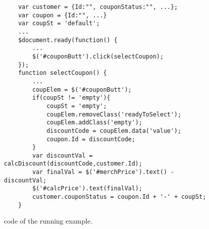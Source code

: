 \begin{figure}
\begin{lstlisting}
	var customer = {Id:"", couponStatus:"", ...};
	var coupon = {Id:"", ...}
	var coupSt = 'default';
	...
	$document.ready(function() {
		...
		$('#couponButt').click(selectCoupon);
	});
	function selectCoupon() {
		...
		coupElem = $('#couponButt');
		if(coupSt != 'empty'){
			coupSt = 'empty';
			coupElem.removeClass('readyToSelect');
			coupElem.addClass('empty');  
			discountCode = coupElem.data('value');
			coupon.Id = discountCode;
		}
		var discountVal = calcDiscount(discountCode,customer.Id);
		var finalVal = $('#merchPrice').text() - discountVal;
		$('#calcPrice').text(finalVal);
		customer.couponStatus = coupon.Id + '-' + coupSt;  
	}

\end{lstlisting}
\vspace{-0.1in} 

\caption{\javascript code of the running example.}
\label{Fig:example}
\vspace{-0.2in} 

\end{figure}